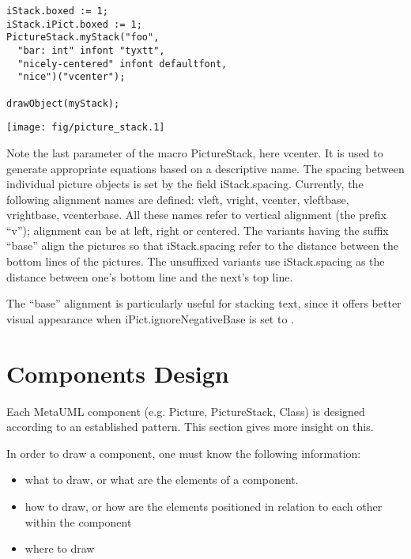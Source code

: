 \documentclass{article}
\newcommand{\code}{\ttfamily}
\begin{document}
\begin{multicols}{2}
\begin{verbatim}
iStack.boxed := 1;
iStack.iPict.boxed := 1;
PictureStack.myStack("foo",
  "bar: int" infont "tyxtt",
  "nicely-centered" infont defaultfont,
  "nice")("vcenter");

drawObject(myStack);
\end{verbatim}
\columnbreak
\hspace{1cm}\texttt{[image: fig/picture\_stack.1]}
\end{multicols}

Note the last parameter of the macro {\code PictureStack}, here {\code vcenter}.
It is used to generate appropriate equations based on a descriptive name.
The spacing between individual picture objects is set by the field
{\code iStack.spacing}. Currently, the following alignment names are
defined: {\code vleft}, {\code vright}, {\code vcenter},
{\code vleftbase}, {\code vrightbase}, {\code vcenterbase}. All these
names refer to vertical alignment (the prefix ``{\code v}''); alignment can
be at left, right or centered. The variants having the suffix ``{\code base}'' align
the pictures so that {\code iStack.spacing} refer to the distance between the
bottom lines of the pictures. The unsuffixed variants use {\code iStack.spacing} as
the distance between one's bottom line and the next's top line.

The ``{\code base}'' alignment is particularly useful for stacking text, since it
offers better visual appearance when {\code iPict.ignoreNegativeBase} is set to {\code 1}.

\section{Components Design}

Each MetaUML component (e.g. {\code Picture}, {\code PictureStack}, {\code Class}) is
designed according to an established pattern. This section gives more insight
on this.

In order to draw a component, one must know the following information:
\begin{itemize}
\item what to draw, or what are the elements of a component.
\item how to draw, or how are the elements positioned in relation to each other within the component
\item where to draw
\end{itemize}
\end{document}
